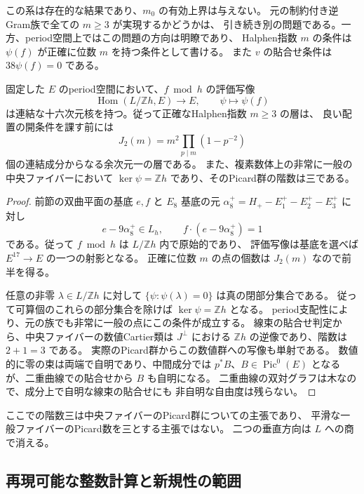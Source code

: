 この系は存在的な結果であり、$m_0$ の有効上界は与えない。
元の制約付き逆Gram族で全ての $m\ge3$ が実現するかどうかは、
引き続き別の問題である。一方、period空間上ではこの問題の方向は明瞭であり、
Halphen指数 $m$ の条件は $\psi(f)$ が正確に位数 $m$ を持つ条件として書ける。
また $v$ の貼合せ条件は $38\psi(f)=0$ である。

\begin{corollary}[貼合せ類の跳躍とHalphen層]
\label{cor:cartier-strata-v30}
固定した $E$ のperiod空間において、$f\bmod h$ の評価写像
\[
 \operatorname{Hom}(L/\mathbb Zh,E)\longrightarrow E,
 \qquad\psi\longmapsto\psi(f)
\]
は連結な十六次元核を持つ。従って正確なHalphen指数 $m\ge3$ の層は、
良い配置の開条件を課す前には
\[
 J_2(m)=m^2\prod_{p\mid m}(1-p^{-2})
\]
個の連結成分からなる余次元一の層である。
また、複素数体上の非常に一般の中央ファイバーにおいて
$\ker\psi=\mathbb Zh$ であり、そのPicard群の階数は三である。
\end{corollary}

\begin{proof}
前節の双曲平面の基底 $e,f$ と $E_8$ 基底の元
$\alpha_8^+=H_+-E_1^+-E_2^+-E_3^+$ に対し
\[
 e-9\alpha_8^+\in L_h,\qquad f\cdot(e-9\alpha_8^+)=1
\]
である。従って $f\bmod h$ は $L/\mathbb Zh$ 内で原始的であり、
評価写像は基底を選べば $E^{17}\to E$ の一つの射影となる。
正確に位数 $m$ の点の個数は $J_2(m)$ なので前半を得る。

任意の非零 $\lambda\in L/\mathbb Zh$ に対して
$\{\psi:\psi(\lambda)=0\}$ は真の閉部分集合である。
従って可算個のこれらの部分集合を除けば $\ker\psi=\mathbb Zh$ となる。
period支配性により、元の族でも非常に一般の点にこの条件が成立する。
線束の貼合せ判定から、中央ファイバーの数値Cartier類は
$J^\perp$ における $\mathbb Zh$ の逆像であり、階数は $2+1=3$ である。
実際のPicard群からこの数値群への写像も単射である。
数値的に零の束は両端で自明であり、中間成分では $p^*B$、$B\in\operatorname{Pic}^0(E)$
となるが、二重曲線での貼合せから $B$ も自明になる。
二重曲線の双対グラフは木なので、成分上で自明な線束の貼合せにも
非自明な自由度は残らない。
\end{proof}

ここでの階数三は中央ファイバーのPicard群についての主張であり、
平滑な一般ファイバーのPicard数を三とする主張ではない。
二つの垂直方向は $L$ への商で消える。

\subsection{再現可能な整数計算と新規性の範囲}

